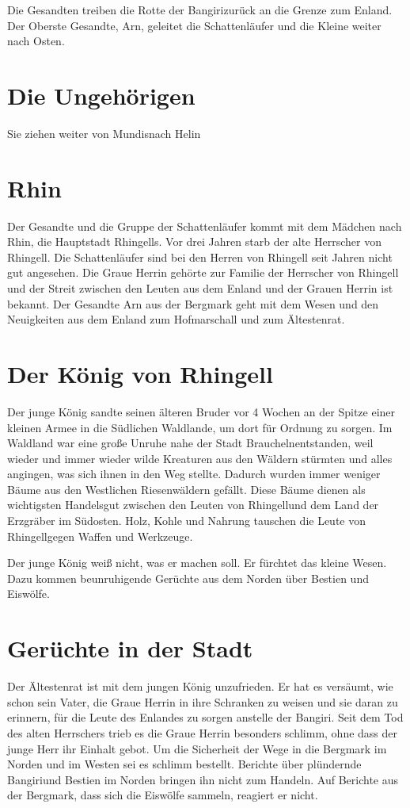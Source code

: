 \documentclass[12pt,a4paper,onecolumn,twoside,ngerman]{book}
\newcommand{\Bangiri}{Bangiri}
\newcommand{\Enland}{Enland}
\newcommand{\Arn}{Arn}
\newcommand{\Rhingell}{Rhingell}
\newcommand{\Mundis}{Mundis}
\newcommand{\Helin}{Helin}
\newcommand{\Braucheln}{Braucheln}
\begin{document}
Die Gesandten treiben die Rotte der \Bangiri zurück an die Grenze zum \Enland. Der Oberste Gesandte, \Arn{,} geleitet die Schattenläufer und die Kleine weiter nach Osten.

\section{Die Ungehörigen}

Sie ziehen weiter von \Mundis nach \Helin

\section{Rhin}

Der Gesandte und die Gruppe der Schattenläufer kommt mit dem Mädchen nach Rhin, die Hauptstadt Rhingells. Vor drei Jahren starb der alte Herrscher von Rhingell. Die Schattenläufer sind bei den Herren von Rhingell seit Jahren nicht gut angesehen. Die Graue Herrin gehörte zur Familie der Herrscher von Rhingell und der Streit zwischen den Leuten aus dem Enland und der Grauen Herrin ist bekannt. Der Gesandte Arn aus der Bergmark geht mit dem Wesen und den Neuigkeiten aus dem Enland zum Hofmarschall und zum Ältestenrat.

\section{Der König von Rhingell}
Der junge König sandte seinen älteren Bruder vor 4 Wochen an der Spitze einer kleinen Armee in die Südlichen Waldlande, um dort für Ordnung zu sorgen. Im Waldland war eine große Unruhe nahe der Stadt \Braucheln entstanden, weil wieder und immer wieder wilde Kreaturen aus den Wäldern stürmten und alles angingen, was sich ihnen in den Weg stellte. Dadurch wurden immer weniger Bäume aus den Westlichen Riesenwäldern gefällt. Diese Bäume dienen als wichtigsten Handelsgut zwischen den Leuten von \Rhingell und dem Land der Erzgräber im Südosten. Holz, Kohle und Nahrung tauschen die Leute von \Rhingell gegen Waffen und Werkzeuge.

Der junge König weiß nicht, was er machen soll. Er fürchtet das kleine Wesen. Dazu kommen beunruhigende Gerüchte aus dem Norden über Bestien und Eiswölfe. 

\section{Gerüchte in der Stadt}
Der Ältestenrat ist mit dem jungen König unzufrieden. Er hat es versäumt, wie schon sein Vater, die Graue Herrin in ihre Schranken zu weisen und sie daran zu erinnern, für die Leute des \Enland{es} zu sorgen anstelle der \Bangiri. Seit dem Tod des alten Herrschers trieb es die Graue Herrin besonders schlimm, ohne dass der junge Herr ihr Einhalt gebot. Um die Sicherheit der Wege in die Bergmark im Norden und im Westen sei es schlimm bestellt. Berichte über plündernde \Bangiri und Bestien im Norden bringen ihn nicht zum Handeln. Auf Berichte aus der Bergmark, dass sich die Eiswölfe sammeln, reagiert er nicht.
\end{document}
